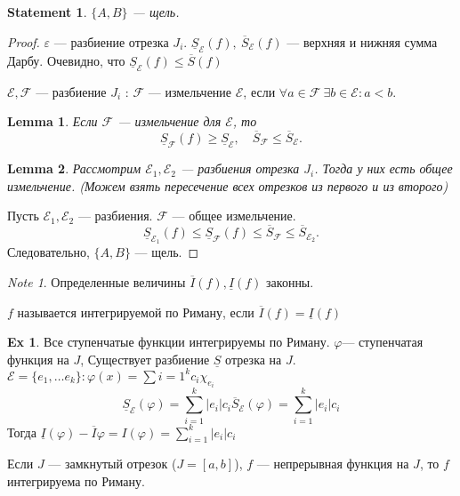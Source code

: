 \documentclass[11pt]{book}
\newcommand{\slim}{\sum\limits}
\renewcommand{\le}{\leqslant}
\renewcommand{\ge}{\geqslant}
\theoremstyle{definition}
\theoremstyle{plain}
\theoremstyle{plain}
\newtheorem*{lm}{Lemma}
\newtheorem*{st}{Statement}
\theoremstyle{definition}
\newtheorem*{ex}{Ex}
\theoremstyle{remark}
\newtheorem*{note}{Note}
\begin{document}
\begin{st}
    $\{A, B\}$ --- щель.
\end{st}
\begin{proof}
    $ \varepsilon $ --- разбиение отрезка $ J_i$.
    $ \underline{S}_{ \mathcal{E} } (f) , ~ \overline{S} _{ \mathcal{E} }(f)$ --- верхняя и нижняя сумма Дарбу.
    Очевидно, что $ \underline{S} _ \mathcal{E}  (f) \le  \overline{S} (f)$

    $ \mathcal{E} , \mathcal{F}$ --- разбиение  $ J_i$ : $ \mathcal{F}$ --- измельчение $ \mathcal{E} $, если $ \forall  a \in  \mathcal{F} ~ \exists  b \in  \mathcal{E} : a<b$.
    \begin{lm}
	Если $ \mathcal{F}$ --- измельчение для $ \mathcal{E} $, то \[
	    \underline{S} _\mathcal{F} (f) \ge \underline{S}_ \mathcal{E} , \quad \overline{S}_\mathcal{F} \le \overline{S}_ \mathcal{E}
	.\]
    \end{lm}
    \begin{lm}
	Рассмотрим  $ \mathcal{E}_1, \mathcal{E}_2$ --- разбиения отрезка $ J_i$.
	Тогда у них есть общее измельчение. (Можем взять пересечение всех отрезков из первого и из второго)
    \end{lm}
    Пусть $ \mathcal{E}_1, \mathcal{E}_2$ --- разбиения. $ \mathcal{F}$ --- общее измельчение.
    \[
	\underline{S}_{\mathcal{E}_1} (f) \le  \underline{S}_{\mathcal{F}} (f) \le \overline{S}_\mathcal{F} \le \overline{S}_{\mathcal{E}_2}
    .\]
    Следовательно, $ \{A, B\}$ --- щель.
\end{proof}
\begin{note}
    Определенные величины $ \overline{I}(f) , \underline{I}(f)$ законны.
\end{note}
\begin{defn}
    $ f$ называется интегрируемой по Риману, если $ \overline{I}(f) = \underline{I}(f)$
\end{defn}
\begin{ex}
\item Все ступенчатые функции интегрируемы по Риману.
    $\varphi $--- ступенчатая функция на $ J$,
    Существует разбиение $ \underline{S}$ отрезка на $ J$.
    $ \mathcal{E} = \{e_1, \ldots  e_k\} : \varphi  (x) = \slim{i=1}^{k} c_i \chi_{e_i}$
    \[
	\underline{S}_{\mathcal{E}}( \varphi ) = \slim_{i=1}^{k} |e_i| c_i
	\overline{S}_{\mathcal{E}}( \varphi ) = \slim_{i=1}^{k} |e_i| c_i
    \]
    Тогда $ \underline{I} ( \varphi ) - \overline{I} \varphi = I( \varphi ) = \slim_{i=1}^{k} |e_i| c_i$
\end{ex}
\begin{thm}
    Если $ J$ --- замкнутый отрезок ($ J = [a, b]$), $ f$ --- непрерывная функция на $ J$, то $ f$ интегрируема по Риману.
\end{thm}
\end{document}

